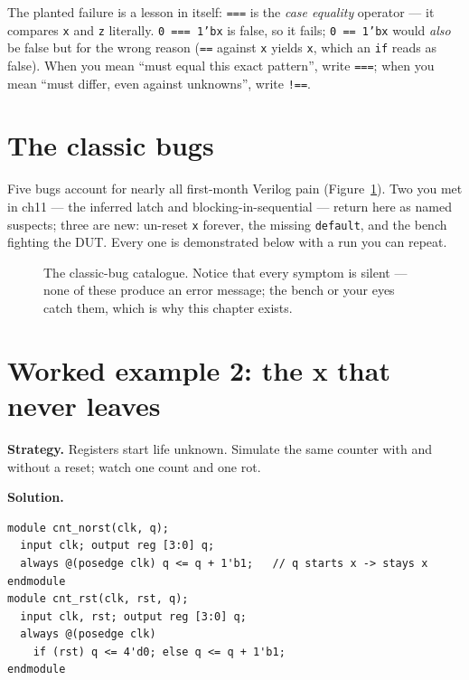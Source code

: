 The planted failure is a lesson in itself: \texttt{===} is the
\emph{case equality} operator --- it compares
\texttt{x} and \texttt{z} literally. \texttt{0 === 1'bx} is false, so
it fails; \texttt{0 == 1'bx} would \emph{also} be false but for the
wrong reason (\texttt{==} against \texttt{x} yields \texttt{x}, which
an \texttt{if} reads as false). When you mean ``must equal this exact
pattern'', write \texttt{===}; when you mean ``must differ, even
against unknowns'', write \texttt{!==}.

\section{The classic bugs}\label{sec:bugs}

Five bugs account for nearly all first-month Verilog pain
(Figure~\ref{fig:bugcat}). Two you met in ch11 --- the inferred latch
and blocking-in-sequential --- return here as named suspects; three
are new: un-reset \texttt{x} forever, the missing \texttt{default},
and the bench fighting the DUT. Every one is demonstrated below with
a run you can repeat.

\begin{figure}[htbp]
\centering

\caption{The classic-bug catalogue. Notice that every symptom is
silent --- none of these produce an error message; the bench or your
eyes catch them, which is why this chapter exists.}
\label{fig:bugcat}
\end{figure}

\section{Worked example 2: the x that never leaves}
\label{sec:we-xprop}

\textbf{Strategy.} Registers start life unknown. Simulate the same
counter with and without a reset; watch one count and one rot.

\textbf{Solution.}
\begin{lstlisting}[caption={\ttfamily code/ch12\_xcounter.v --- the
only difference is \texttt{rst}.},label={lst:xcounter}]
module cnt_norst(clk, q);
  input clk; output reg [3:0] q;
  always @(posedge clk) q <= q + 1'b1;   // q starts x -> stays x
endmodule
module cnt_rst(clk, rst, q);
  input clk, rst; output reg [3:0] q;
  always @(posedge clk)
    if (rst) q <= 4'd0; else q <= q + 1'b1;
endmodule
\end{lstlisting}


